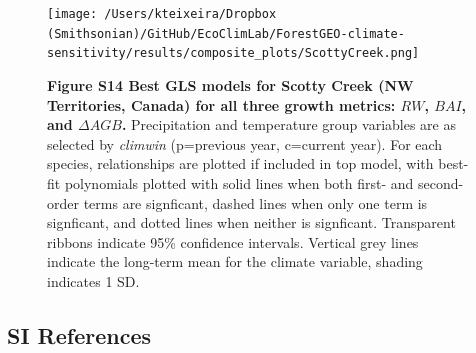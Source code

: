 \documentclass[
]{article}
\begin{document}
\begin{figure}
\centering
\texttt{[image: /Users/kteixeira/Dropbox (Smithsonian)/GitHub/EcoClimLab/ForestGEO-climate-sensitivity/results/composite\_plots/ScottyCreek.png]}
\caption{\textbf{Figure S14 \textbar{} Best GLS models for Scotty Creek
(NW Territories, Canada) for all three growth metrics: \(RW\), \(BAI\),
and \(\Delta AGB\).} Precipitation and temperature group variables are
as selected by \emph{climwin} (p=previous year, c=current year). For
each species, relationships are plotted if included in top model, with
best-fit polynomials plotted with solid lines when both first- and
second-order terms are signficant, dashed lines when only one term is
signficant, and dotted lines when neither is signficant. Transparent
ribbons indicate 95\% confidence intervals. Vertical grey lines indicate
the long-term mean for the climate variable, shading indicates 1 SD.}
\end{figure}

\newpage

\hypertarget{si-references}{%
\subsection*{SI References}\label{si-references}}
\end{document}
